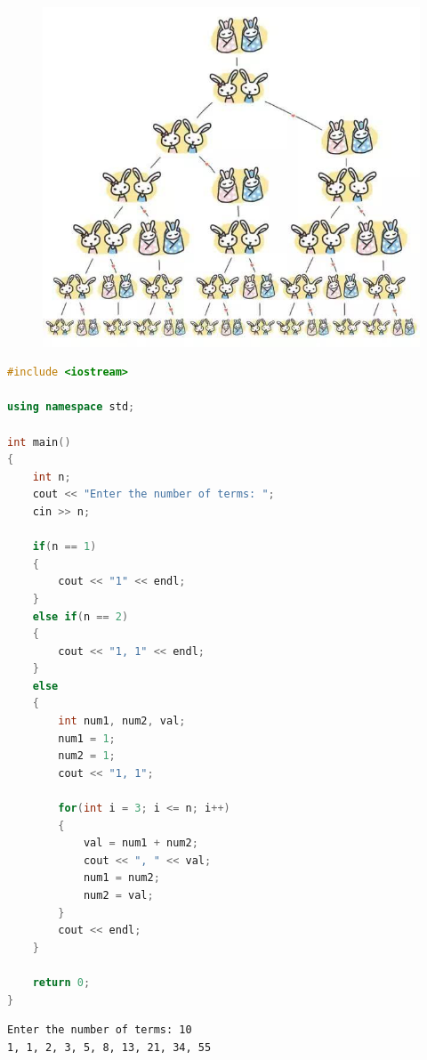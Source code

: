 \begin{figure}[H]
    \centering
    \includegraphics[scale=0.5]{img/Chapter3/3-2/1.png}
\end{figure}

\begin{lstlisting}[language=C++]
#include <iostream>

using namespace std;

int main()
{
    int n;
    cout << "Enter the number of terms: ";
    cin >> n;

    if(n == 1)
    {
        cout << "1" << endl;
    }
    else if(n == 2)
    {
        cout << "1, 1" << endl;
    }
    else
    {
        int num1, num2, val;
        num1 = 1;
        num2 = 1;
        cout << "1, 1";

        for(int i = 3; i <= n; i++)
        {
            val = num1 + num2;
            cout << ", " << val;
            num1 = num2;
            num2 = val;
        }
        cout << endl;
    }
    
    return 0;
}
\end{lstlisting}

\begin{tcolorbox}
    \begin{verbatim}
Enter the number of terms: 10
1, 1, 2, 3, 5, 8, 13, 21, 34, 55
\end{verbatim}
\end{tcolorbox}

